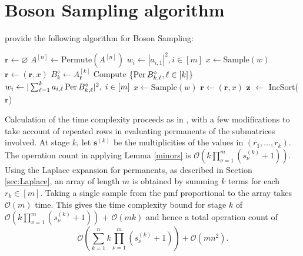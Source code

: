 \documentclass[a4paper,11pt]{article}
\newcommand{\perm}{\mathop{\textup{Per}}}
\newcommand{\bigo}[1]{\mathcal{O}(#1)}
\newcommand*\Let[2]{\State #1 $\gets$ #2}
\newcommand{\Bkl}{B^{\diamond}_{k,\ell}}
\newcommand{\Bk}{B^{\diamond}_{k}}
\def\BS/{Boson Sampling}
\begin{document}

\section{\BS/ algorithm}

\citet{clifford2018classical} provide the following algorithm for \BS/:
\begin{algorithm}
	\caption{Boson sampler: single sample $\mathbf{z}$ from $q(\mathbf{z}|A)$ 
		\label{alg:better}}
	\begin{algorithmic}[1]
		\State $\mathbf{r} \gets \varnothing$ 
		\State $A^{[n]} \gets \textrm{Permute}(A^{[n]})$ 
		\State $w_i \gets |a_{i,1}|^2, i \in [m]$ 
		\State $x \gets \textrm{Sample}(w)$ 
		\State $\mathbf{r} \gets (\mathbf{r}, x)$ 
		\State $\Bk \gets A^{[k]}_{\mathbf{r}}$
		\State \sc Compute $\{\perm \Bkl, \ell \in [k] $\} 
		\State $w_i \gets |\sum_{\ell = 1}^k a_{i,\ell} \perm \Bkl|^2,\; i \in [m]$ 
		\State $x \gets \textrm{Sample}(w)$ 
		\State $\mathbf{r} \gets (\mathbf{r}, x)$
		\EndFor
		\Let{$\mathbf{z}$}{\sc IncSort($\mathbf{r}$)} 
		\State {}
	\end{algorithmic}
\end{algorithm}

Calculation of the time complexity proceeds as in \citet{clifford2018classical}, with a few modifications to take account of repeated rows in evaluating permanents of the submatrices involved.  At stage $k$, let $\mathbf{s}^{(k)}$ be the multiplicities of the values in $(r_1,\dots,r_k)$.  The operation count in applying Lemma \ref{minors} is $\bigo{k \prod_{\nu=1}^m (s_\nu^{(k)}+1)}$. Using the Laplace expansion for permanents, as described in Section \ref{sec:Laplace}, an array of length $m$ is obtained by summing $k$ terms for each $r_k \in [m]$.  Taking a single sample from the pmf proportional to the array takes $\bigo{m}$ time. This gives the time complexity bound for stage $k$ of $\bigo{k \prod_{\nu=1}^m (s_\nu^{(k)}+1)}$ + $\bigo{mk}$ and hence a total operation count of 
\begin{equation}\label{eq:complexity}
\bigo{\textstyle{\sum_{k=1}^n k \prod_{\nu=1}^m (s_\nu^{(k)}+1)}} + \bigo{mn^2}.
\end{equation}
\end{document}

